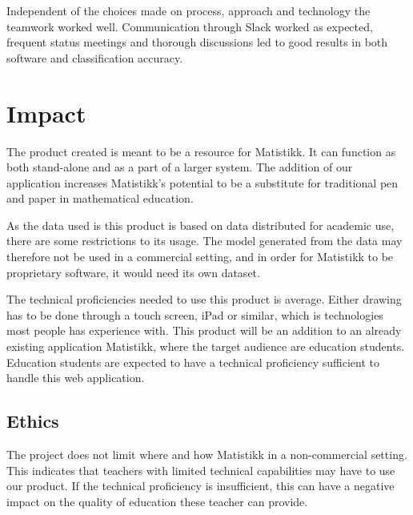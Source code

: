 Independent of the choices made on process, approach and technology the teamwork worked well. Communication through Slack worked as expected, frequent status meetings and thorough discussions led to good results in both software and classification accuracy.

\section{Impact}


% 

The product created is meant to be a resource for Matistikk. It can function as both stand-alone and as a part of a larger system. The addition of our application increases Matistikk's potential to be a substitute for traditional pen and paper in mathematical education.

As the data used is this product is based on data distributed for academic use, there are some restrictions to its usage. The model generated from the data may therefore not be used in a commercial setting, and in order for Matistikk to be proprietary software, it would need its own dataset.

The technical proficiencies needed to use this product is average. Either drawing has to be done through a touch screen, iPad or similar, which is technologies most people has experience with. This product will be an addition to an already existing application Matistikk, where the target audience are education students. Education students are expected to have a technical proficiency sufficient to handle this web application.

\subsection{Ethics}

The project does not limit where and how Matistikk in a non-commercial setting. This indicates that teachers with limited technical capabilities may have to use our product. If the technical proficiency is insufficient, this can have a negative impact on the quality of education these teacher can provide. 

